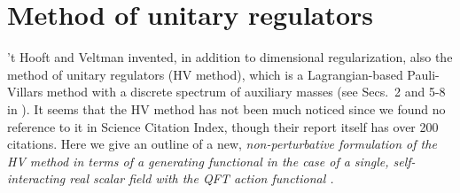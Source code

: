 \documentclass[a4paper,12pt]{article}
\providecommand{\polje}{\phi}
\providecommand{\akcija}{I}
\begin{document}
\section{Method of unitary regulators}
\label{secunireg}

't Hooft and Veltman invented, in addition to dimensional regularization, also the method of unitary regulators (HV method), which is a Lagrangian-based Pauli-Villars method with a discrete spectrum of auxiliary masses (see Secs.~2 and 5-8 in \cite{Hooft}). It seems that the HV method  has not been much noticed since we found no reference to it in Science Citation Index, though their report \cite{Hooft} itself has over 200 citations. Here we give an outline of a new, \it non-perturbative formulation \rm of the HV method in terms of a generating functional in the case of a single, self-interacting real scalar field with the QFT action functional \myHighlight{$\akcija[\polje,J]$}\coordHE{}.
\end{document}

